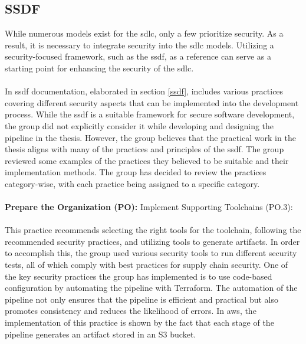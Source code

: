 \subsection{SSDF}
While numerous models exist for the \acrlong{sdlc}, only a few prioritize security. As a result, it is necessary to integrate security into the \acrshort{sdlc} models. Utilizing a security-focused framework, such as the \acrshort{ssdf}, as a reference can serve as a starting point for enhancing the security of the \acrshort{sdlc}. 
\\~\\
In \acrshort{ssdf} documentation, elaborated in section \ref{ssdf}, includes various practices covering different security aspects that can be implemented into the development process. While the \acrshort{ssdf} is a suitable framework for secure software development, the group did not explicitly consider it while developing and designing the \gls{pipeline} in the thesis. However, the group believes that the practical work in the thesis aligns with many of the practices and principles of the \acrshort{ssdf}. The group reviewed some examples of the practices they believed to be suitable and their implementation methods. The group has decided to review the practices category-wise, with each practice being assigned to a specific category. 
\\~\\
\textbf{Prepare the Organization (PO):}
Implement Supporting Toolchains (PO.3): \textit{}\cite{ssdf}
\\~\\
This practice recommends selecting the right tools for the toolchain, following the recommended security practices, and utilizing tools to generate artifacts. In order to accomplish this, the group used various security tools to run different security tests, all of which comply with best practices for supply chain security. One of the key security practices the group has implemented is to use code-based configuration by automating the \gls{pipeline} with Terraform. The automation of the \gls{pipeline} not only ensures that the pipeline is efficient and practical but also promotes consistency and reduces the likelihood of errors. In \acrshort{aws}, the implementation of this practice is shown by the fact that each stage of the \gls{pipeline} generates an artifact stored in an S3 bucket. 

